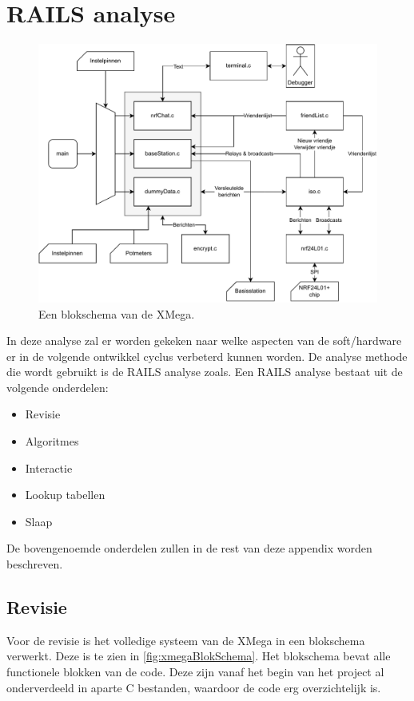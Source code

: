 \section{RAILS analyse} \label{app:railsAnalysis}

\begin{figure}[ht]
    \centering
    \includegraphics[width=\textwidth]{img/xmegablokshema}
    \caption{Een blokschema van de XMega.}
    \label{fig:xmegaBlokSchema}
\end{figure}

\noindent
In deze analyse zal er worden gekeken naar welke aspecten van de soft/hardware er in de volgende ontwikkel cyclus verbeterd kunnen worden. De analyse methode die wordt gebruikt is de RAILS analyse zoals. Een RAILS analyse bestaat uit de volgende onderdelen:
\begin{itemize}
    \item Revisie
    \item Algoritmes
    \item Interactie
    \item Lookup tabellen
    \item Slaap
\end{itemize}
De bovengenoemde onderdelen zullen in de rest van deze appendix worden beschreven.

\subsection{Revisie}

Voor de revisie is het volledige systeem van de XMega in een blokschema verwerkt. Deze is te zien in \autoref{fig:xmegaBlokSchema}. Het blokschema bevat alle functionele blokken van de code. Deze zijn vanaf het begin van het project al onderverdeeld in aparte C bestanden, waardoor de code erg overzichtelijk is.


